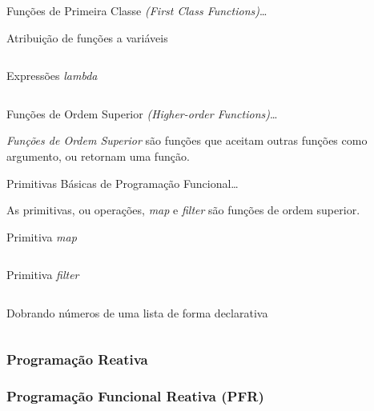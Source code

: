 Funções de Primeira Classe \emph{(First Class Functions)}…


\begin{listing}[H]
  \centering
  \caption{Atribuição de funções a variáveis}
  \inputminted{js}{code/fp_first_class_functions.js}
  \label{code:fp_first_class_functions}
\end{listing}

\begin{listing}[H]
  \centering
  \caption{Expressões \emph{lambda}}
  \inputminted{js}{code/fp_lambdas.js}
  \label{code:fp_lambdas}
\end{listing}

Funções de Ordem Superior \emph{(Higher-order Functions)}…


\emph{Funções de Ordem Superior} são funções que aceitam outras funções como
argumento, ou retornam uma função.


Primitivas Básicas de Programação Funcional…


As primitivas, ou operações, \emph{map} e \emph{filter} são funções de ordem superior.

\begin{listing}[H]
  \centering
  \caption{Primitiva \emph{map}}
  \inputminted{js}{code/fp_primitives_map.js}
  \label{code:fp_primitives_map}
\end{listing}

\begin{listing}[H]
  \centering
  \caption{Primitiva \emph{filter}}
  \inputminted{js}{code/fp_primitives_filter.js}
  \label{code:fp_primitives_filter}
\end{listing}


\begin{listing}[H]
  \centering
  \caption{Dobrando números de uma lista de forma declarativa}
  \inputminted{js}{code/fn_double_numbers_declarative.js}
  \label{code:fn_double_numbers_declarative}
\end{listing}


\subsubsection{Programação Reativa}
\label{sec:rp}



\subsubsection{Programação Funcional Reativa (PFR)}
\label{sec:frp}

